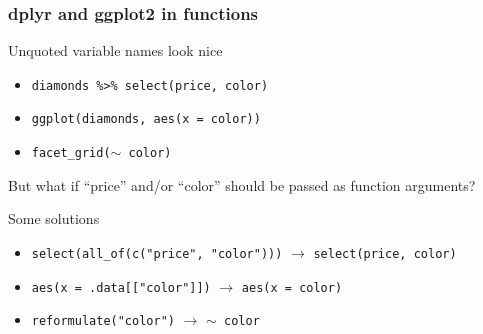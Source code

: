 \begin{frame}
	\frametitle{dplyr and ggplot2 in functions}

	\begin{block}{Unquoted variable names look nice}
		\begin{itemize}
			\item \texttt{diamonds \%>\% select(price, color)}
			\item \texttt{ggplot(diamonds, aes(x = color))}
			\item \texttt{facet\_grid($\sim$ color)}
		\end{itemize}
	\end{block}
	
	But what if ``price'' and/or ``color'' should be passed as function arguments?
	
	\vfill
	
	\begin{block}{Some solutions}
		\begin{itemize}
			\item \texttt{select(all\_of(c("price", "color")))} $\rightarrow$ \texttt{select(price, color)}
			\item \texttt{aes(x = .data[["color"]])} $\rightarrow$ \texttt{aes(x = color)}
			\item \texttt{reformulate("color")} $\rightarrow$ \texttt{$\sim$ color}
		\end{itemize}
	\end{block}

	\vfill
	
	\begin{example}
	\end{example}
\end{frame}

